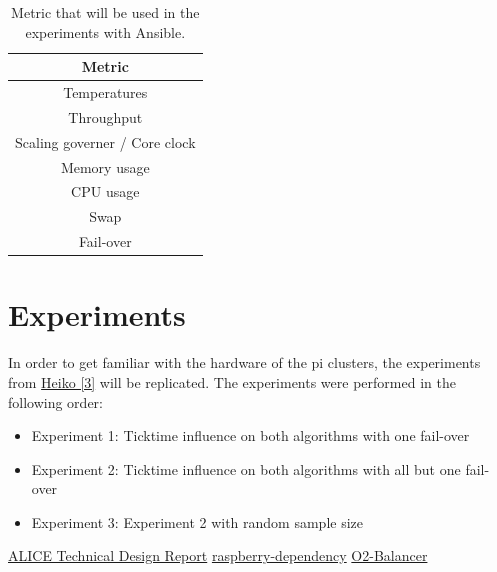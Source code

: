 \documentclass[]{article}
\begin{document}
\begin{table}[H]
	\begin{center}
		\begin{tabular}{ | c | }
			\hline
			Metric \\ \hline
			Temperatures \\ \hline
			Throughput \\ \hline
			Scaling governer / Core clock \\ \hline
			Memory usage \\ \hline
			CPU usage \\ \hline
			Swap \\ \hline
			Fail-over \\
			\hline
		\end{tabular}
		\caption{Metric that will be used in the experiments with Ansible.}
		\label{tab:specs}
	\end{center}
\end{table}


\section{Experiments}

In order to get familiar with the hardware of the pi clusters, the experiments from \hyperref[sec:ref03]{Heiko [3]} will be replicated. The experiments were performed in the following order:
\begin{itemize}
	\item Experiment 1: Ticktime influence on both algorithms with one fail-over
	\item Experiment 2: Ticktime influence on both algorithms with all but one fail-over
	\item Experiment 3: Experiment 2 with random sample size
\end{itemize}

\printnoidxglossary[type=\acronymtype]


\begin{thebibliography}{}
	\label{sec:ref01}\bibitem{}\href{http://cds.cern.ch/record/2011297/files/ALICE-TDR-019.pdf?version=3}{ALICE Technical Design Report}
	\label{sec:ref02}\bibitem{}\href{https://github.com/hexoxide/raspberry-dependency}{raspberry-dependency}
	\label{sec:ref03}\bibitem{}\href{https://github.com/hexoxide/O2-Balancer}{O2-Balancer}
\end{thebibliography}
\end{document}
